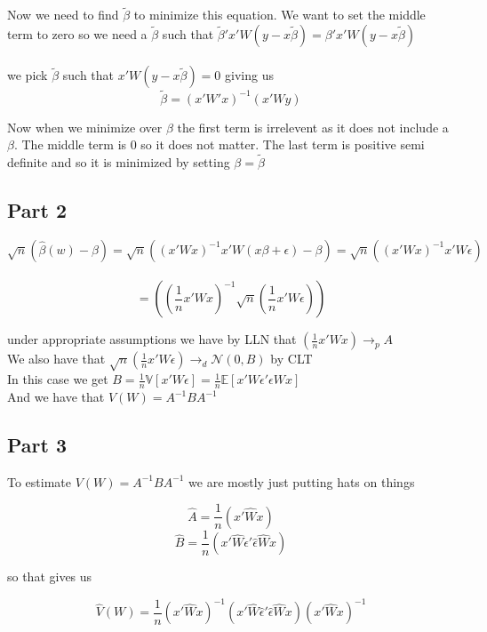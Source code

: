 \documentclass[11pt]{article}
\newcommand{\plim}{\rightarrow_{p}}
\begin{document}
Now we need to find $\tilde{\beta}$ to minimize this equation. We want to set the middle term to zero so we need a $\tilde{\beta}$ such that $\tilde{\beta}'x'W(y-x\tilde{\beta}) = \beta'x'W(y-x\tilde{\beta})$
\\ \\ 
we pick $\tilde{\beta}$ such that $x'W(y-x\tilde{\beta}) = 0$ giving us $$\tilde{\beta}=(x'W'x)^{-1}(x'Wy)$$

Now when we minimize over $\beta$ the first term is irrelevent as it does not include a $\beta$. The middle term is 0 so it does not matter. The last term is positive semi definite and so it is minimized by setting $\beta = \tilde{\beta}$

\subsection{Part 2}

$$ \sqrt{n} (\hat{\beta}(w)- \beta) = \sqrt{n}((x'Wx)^{-1}x'W(x\beta+\epsilon)-\beta)  
= \sqrt{n}((x'Wx)^{-1}x'W \epsilon)$$ \\
$$ = ((\frac{1}{n}x'Wx)^{-1} \sqrt{n} (\frac{1}{n} x'W\epsilon))$$

under appropriate assumptions we have by LLN that $ (\frac{1}{n}x'Wx) \plim A $ \\
We also have that $  \sqrt{n} (\frac{1}{n} x'W\epsilon) \rightarrow_{d} \mathcal{N}(0,B)$ by CLT  \\
In this case we get $ B = \frac{1}{n}  \mathbb{V}[x'W\epsilon] = \frac{1}{n} \mathbb{E}[x'W\epsilon'\epsilon Wx] $\\
And we have that $ V(W) = A^{-1}BA^{-1} $
 
\subsection{Part 3}

To estimate $V(W) = A^{-1}BA^{-1} $ we are mostly just putting hats on things 

$$\hat{A} = \frac{1}{n}(x'\hat{W}x)$$ 
$$\hat{B} = \frac{1}{n}(x'\hat{W} \hat{\epsilon}' \hat{\epsilon} \hat{W}x)$$

 so that gives us 
 
 $$ \hat{V}(W) = \frac{1}{n} (x'\hat{W}x)^{-1} (x'\hat{W} \hat{\epsilon}' \hat{\epsilon} \hat{W}x) (x'\hat{W}x)^{-1} $$
\end{document}
